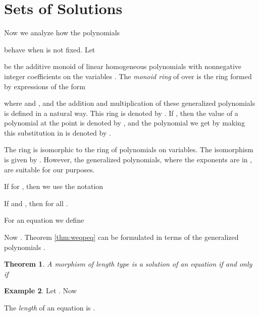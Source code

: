 \documentclass[submission]{eptcs}
\newtheorem{theorem}{Theorem}[section]
\theoremstyle{definition}
\newtheorem{example}[theorem]{Example}
\begin{document}
\section{Sets of Solutions} \label{sect:solsets}

Now we analyze how the polynomials

behave when  is not fixed. Let

be the additive monoid of linear homogeneous polynomials with
nonnegative integer coefficients on the variables .
The \emph{monoid ring} of  over  is the ring formed by
expressions of the form

where  and , and the addition and
multiplication of these generalized polynomials is defined in a
natural way. This ring is denoted by . If ,
then the value of a polynomial  at the point  is denoted by , and the polynomial we get by
making this substitution in  is denoted by .

The ring  is isomorphic to the ring  of polynomials on  variables. The isomorphism is given by
. However, the generalized polynomials, where
the exponents are in , are suitable for our purposes.

If  for , then we use the notation

If  and , then  for all
.

For an equation 
we define

Now . Theorem \ref{thm:weqpeq} can be
formulated in terms of the generalized polynomials .

\begin{theorem}
A morphism  of length type  is a solution
of an equation  if and only if

\end{theorem}

\begin{example}
Let . Now

\end{example}

The \emph{length} of an equation  is .
\end{document}
